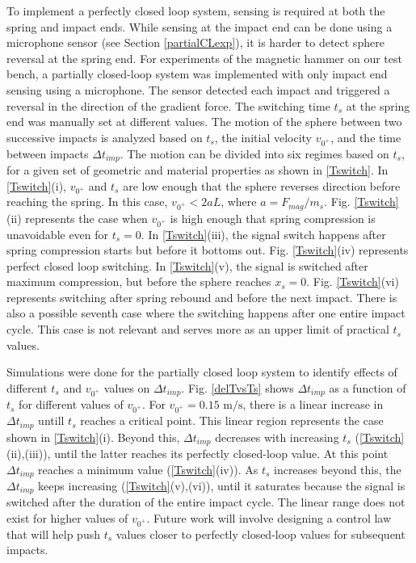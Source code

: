 \documentclass[letterpaper, 10 pt, conference]{ieeeconf}  %
\begin{document}
To implement a perfectly closed loop system, sensing is required at both the spring and impact ends. While sensing at the impact end can be done using a microphone sensor (see Section \ref{partialCLexp}), it is harder to detect sphere reversal at the spring end. For experiments of the magnetic hammer on our test bench, a partially closed-loop system was implemented with only impact end sensing using a microphone. The sensor detected each impact and triggered a reversal in the direction of the gradient force. The switching time $t_s$ at the spring end was manually set at different values. The motion of the sphere between two successive impacts is analyzed based on $t_s$, the initial velocity $v_{0^+}$, and the time between impacts $\Delta t_{imp}$. The motion can be divided into six regimes based on $t_s$, for a given set of geometric and material properties as shown in \cref{Tswitch}. In \cref{Tswitch}(i), $v_{0^+}$ and $t_s$ are low enough that the sphere reverses direction before reaching the spring. In this case, $v_{0^+} < 2aL$, where $a=F_{mag}/m_s$. Fig. \ref{Tswitch}(ii) represents the case when $v_{0^+}$ is high enough that spring compression is unavoidable even for $t_s = 0$. In \cref{Tswitch}(iii), the signal switch happens after spring compression starts but before it bottoms out. Fig. \ref{Tswitch}(iv) represents perfect closed loop switching. In \cref{Tswitch}(v), the signal is switched after maximum compression, but before the sphere reaches $x_s=0$. Fig. \ref{Tswitch}(vi) represents switching after spring rebound and before the next impact. There is also a possible seventh case where the switching happens after one entire impact cycle. This case is not relevant and serves more as an upper limit of practical $t_s$ values. 

Simulations were done for the partially closed loop system to identify effects of different $t_s$ and $v_{0^+}$ values on $\Delta t_{imp}$. Fig. \ref{delTvsTs} shows $\Delta t_{imp}$ as a function of $t_s$ for different values of $v_{0^+}$. For $v_{0^+}=0.15\text{ m/s}$, there is a linear increase in $\Delta t_{imp}$ untill $t_s$ reaches a critical point. This linear region represents the case shown in \cref{Tswitch}(i). Beyond this, $\Delta t_{imp}$ decreases with increasing $t_s$ (\cref{Tswitch}(ii),(iii)), until the latter reaches its perfectly closed-loop value. At this point $\Delta t_{imp}$ reaches a minimum value (\cref{Tswitch}(iv)). As $t_s$ increases beyond this, the $\Delta t_{imp}$ keeps increasing (\cref{Tswitch}(v),(vi)), until it saturates because the signal is switched after the duration of the entire impact cycle. The linear range does not exist for higher values of $v_{0^+}$. Future work will involve designing a control law that will help push $t_s$ values closer to perfectly closed-loop values for subsequent impacts.
\end{document}
